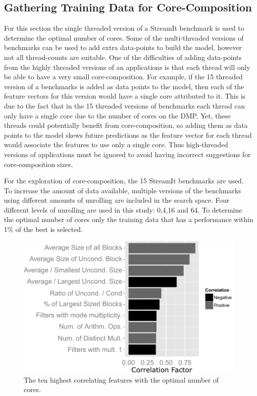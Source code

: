 \subsection{Gathering Training Data for Core-Composition}
For this section the single threaded version of a StreamIt benchmark is used to determine the optimal number of cores.
Some of the multi-threaded versions of benchmarks can be used to add extra data-points to build the model, however not all thread-counts are suitable.
One of the difficulties of adding data-points from the highly threaded versions of an applications is that each thread will only be able to have a very small core-composition.
For example, if the 15 threaded version of a benchmarks is added as data points to the model, then each of the feature vectors for this version would have a single core attributed to it.
This is due to the fact that in the 15 threaded versions of benchmarks each thread can only have a single core due to the number of cores on the DMP.
Yet, these threads could potentially benefit from core-composition, so adding them as data points to the model skews future predictions as the feature vector for each thread would associate the features to use only a single core.
Thus high-threaded versions of applications must be ignored to avoid having incorrect suggestions for core-composition sizes.

For the exploration of core-composition, the 15 StreamIt benchmarks are used. %
To increase the amount of data available, multiple versions of the benchmarks using different amounts of unrolling are included in the search space.
Four different levels of unrolling are used in this study: 0,4,16 and 64.
To determine the optimal number of cores only the training data that has a performance within 1\% of the best is selected.

\begin{figure}[t]
\centering
  \includegraphics[width=1\textwidth]{streamit-paper/graphics/corrGraph_remix.pdf}
  \caption{The ten highest correlating features with the optimal number of cores.}\label{fig:corrCore}
\end{figure}


